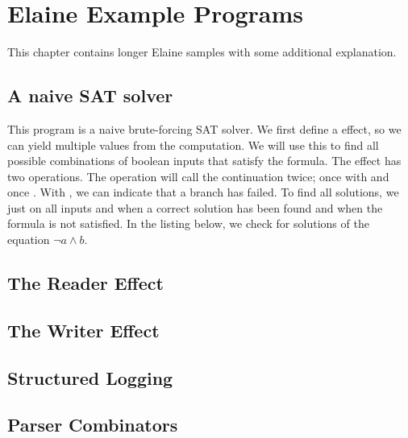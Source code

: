 \chapter{Elaine Example Programs}\label{chap:examples}

This chapter contains longer Elaine samples with some additional explanation.

\section{A naive SAT solver}\label{sec:sat}

This program is a naive brute-forcing SAT solver. We first define a  effect, so we can yield multiple values from the computation. We will use this to find all possible combinations of boolean inputs that satisfy the formula. The  effect has two operations. The  operation will call the continuation twice; once with  and once . With , we can indicate that a branch has failed. To find all solutions, we just  on all inputs and  when a correct solution has been found and  when the formula is not satisfied. In the listing below, we check for solutions of the equation $\neg a \wedge b$.


\section{The Reader Effect}\label{sec:reader}



\section{The Writer Effect}\label{sec:writer}


\section{Structured Logging}



\section{Parser Combinators}

